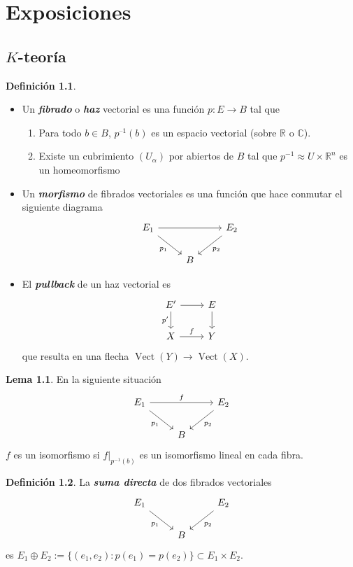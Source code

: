 \documentclass[spanish]{book}
\theoremstyle{definition}
\newtheorem*{defn}{Definición}
\newtheorem*{lema}{Lema}
\newcommand{\R}{\mathbb{R}}
\newcommand{\C}{\mathbb{C}}
\begin{document}
\clearpage
\chapter{Exposiciones}
\section{$K$-teoría}
\begin{defn}\leavevmode
	\begin{itemize}
		\item Un \textbf{\textit{fibrado}} o \textbf{\textit{haz}} vectorial es una función $p:E\to B$ tal que
	\begin{enumerate}
		\item Para todo $b\in B$, $p^{–1}(b)$ es un espacio vectorial (sobre $\R$ o $\C$).
		
		\item Existe un cubrimiento $(U_\alpha)$ por abiertos de $B$ tal que $p^{-1}\approx U\times\R^n$ es un homeomorfismo
	\end{enumerate}
	\item Un \textbf{\textit{morfismo}} de fibrados vectoriales es una función que hace conmutar el siguiente diagrama
	\[\begin{tikzcd}
		E_1\arrow[rr]\arrow[dr,swap,"p_1"]&&E_2\arrow[dl,"p_2"]\\
		&B
	\end{tikzcd}\]
	\item El \textbf{\textit{pullback}} de un haz vectorial es
	\[\begin{tikzcd}
		E'\arrow[r]\arrow[d,swap,"p'"]&E\arrow[d]\\
		X\arrow[r,"f"]&Y
	\end{tikzcd}\]
	que resulta en una flecha $\operatorname{Vect}(Y)\to\operatorname{Vect}(X)$.
	\end{itemize}
\end{defn}
\begin{lema}
	En la siguiente situación
	\[\begin{tikzcd}
		E_1\arrow[rr,"f"]\arrow[rd,swap,"p_1"]&&E_2\arrow[ld,"p_2"]\\
		&B
	\end{tikzcd}\]
	$f$ es un isomorfismo si $f|_{p^{-1}(b)}$ es un isomorfismo lineal en cada fibra.
\end{lema}

\begin{defn}
	La \textbf{\textit{suma directa}} de dos fibrados vectoriales
	\[\begin{tikzcd}
		E_1\arrow[rd,swap,"p_1"]&&E_2\arrow[ld,"p_2"]\\
		&B
	\end{tikzcd}\]
	es $E_1\oplus E_2:=\{(e_1,e_2):p(e_1)=p(e_2)\}\subset E_1\times E_2$.
\end{defn}
\end{document}
